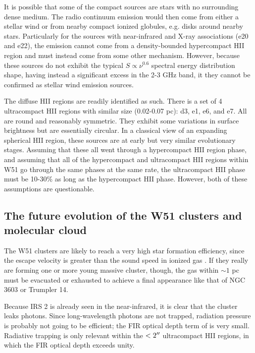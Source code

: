 It is possible that some of the compact sources are stars with no surrounding
dense medium.  The radio continuum emission would then come from either a
stellar wind or from nearby compact ionized globules, e.g. disks around nearby
stars.  Particularly for the sources with near-infrared and X-ray associations
(e20 and e22), the emission cannot come from a density-bounded hypercompact HII
region and must instead come from some other mechanism.  However, because these
sources do not exhibit the typical $S\propto\nu^{0.6}$ spectral energy
distribution shape, having instead a significant excess in the 2-3 GHz band, it
they cannot be confirmed as stellar wind emission sources.

The diffuse HII regions are readily identified as such.  There is a set of 4
ultracompact HII regions with similar size (0.02-0.07 pc): d3, e1, e6, and e7.
All are round and reasonably symmetric.  They exhibit
some variations in surface brightness but are essentially circular.  In a
classical view of an expanding spherical HII region, these sources are at early
but very similar evolutionary stages.  Assuming that these all went through a
hypercompact HII region phase, and assuming that all of the hypercompact and
ultracompact HII regions within W51 go through the same phases at the same
rate, the ultracompact HII phase must be 10-30\% as long as the hypercompact
HII phase.  However, both of these assumptions are questionable.



\subsection{The future evolution of the W51 clusters and molecular cloud}
The W51 clusters are likely to reach a very high star formation efficiency,
since the escape velocity is greater than the sound speed in ionized gas
\citep{Ginsburg2012a,Bressert2012a}.  If they really are forming one or more
young massive cluster, though, the gas within $\sim 1$ pc must be evacuated or
exhausted to achieve a final appearance like that of NGC 3603 or Trumpler 14.

Because IRS 2 is already seen in the near-infrared, it is clear that
the cluster leaks photons.  Since long-wavelength photons are not trapped,
radiation pressure is probably not going to be efficient; the FIR optical depth
term of \citet{Murray2010a} is very small.  Radiative trapping is only
relevant within the $<2\mbox{$^{\prime\prime}$}$ ultracompact HII regions, in which the FIR optical
depth exceeds unity.

